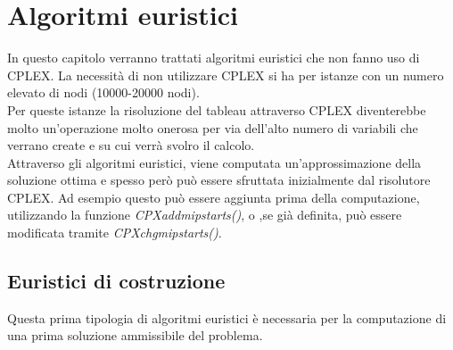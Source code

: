 \chapter{Algoritmi euristici}
In questo capitolo verranno trattati algoritmi euristici che non fanno uso di CPLEX. La necessità di non utilizzare CPLEX si ha per istanze con un numero elevato di nodi (10000-20000 nodi).\\
Per queste istanze la risoluzione del tableau attraverso CPLEX diventerebbe molto un'operazione molto onerosa per via dell'alto numero di variabili che verrano create e su cui verrà svolro il calcolo.\\
Attraverso gli algoritmi euristici, viene computata un'approssimazione della soluzione ottima e spesso però può essere sfruttata inizialmente dal risolutore CPLEX. Ad esempio questo può essere aggiunta prima della computazione, utilizzando la funzione \textit{CPXaddmipstarts()}, o ,se già definita, può essere modificata tramite \textit{CPXchgmipstarts()}.

\section{Euristici di costruzione}
Questa prima tipologia di algoritmi euristici è necessaria per la computazione di una prima soluzione ammissibile del problema.
